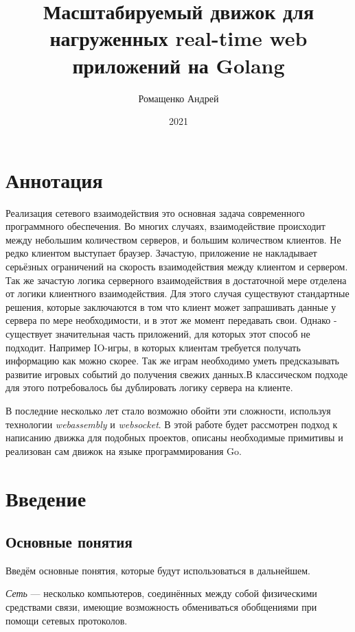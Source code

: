 \documentclass[a4paper,14pt, openany]{book}
\title{Масштабируемый движок для нагруженных real-time web приложений на Golang}
\author{Ромащенко Андрей}
\date{2021}
\begin{document}
\maketitle

\chapter*{Аннотация}

Реализация сетевого взаимодействия это основная задача современного программного обеспечения. Во многих случаях, взаимодействие происходит между небольшим количеством серверов, и большим количеством клиентов. Не редко клиентом выступает браузер. Зачастую, приложение не накладывает серьёзных ограничений на скорость взаимодействия между клиентом и сервером. Так же зачастую логика серверного взаимодействия в достаточной мере отделена от логики клиентного взаимодействия. Для этого случая существуют стандартные решения, которые заключаются в том что клиент может запрашивать данные у сервера по мере необходимости, и в этот же момент передавать свои. Однако - существует значительная часть приложений, для которых этот способ не подходит. Например IO-игры, в которых клиентам требуется получать информацию как можно скорее. Так же играм необходимо уметь предсказывать развитие игровых событий до получения свежих данных.В классическом подходе для этого потребовалось бы дублировать логику сервера на клиенте.

В последние несколько лет стало возможно обойти эти сложности, используя технологии \textit{webassembly}  и \textit{websocket}. В этой работе будет рассмотрен подход к написанию движка для подобных проектов, описаны необходимые примитивы и реализован сам движок на языке программирования Go.
\par
\setcounter{page}{2}
\tableofcontents
\clearpage

\chapter{Введение}

\section{Основные понятия}

Введём основные понятия, которые будут использоваться в дальнейшем.

\emph{Сеть} --- несколько компьютеров, соединённых между собой физическими средствами связи, имеющие возможность обмениваться обобщениями при помощи сетевых протоколов.
\end{document}
